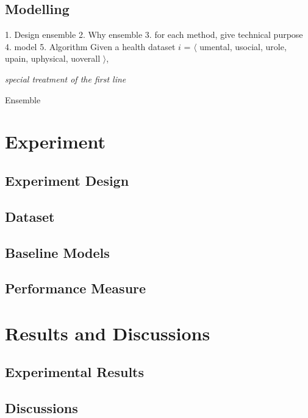 \documentclass[runningheads]{llncs}
\begin{document}
\subsection{Modelling}
%
%
1. Design ensemble
2. Why ensemble
3. for each method, give technical purpose
4. model
5. Algorithm
%
Given a health dataset $i$ = $\langle$ u{\tiny{mental}}, u{\tiny{social}}, u{\tiny{role}}, u{\tiny{pain}}, u{\tiny{physical}}, u{\tiny{overall}} $\rangle$, \\
%
%
\IncMargin{1em}
\begin{algorithm}
		\BlankLine
		\emph{special treatment of the first line}\;
	\caption{Ensemble}\label{algo_disjdecomp}
\end{algorithm}
\DecMargin{1em}
%
%
\pagebreak
\section{Experiment}
\subsection{Experiment Design}
\subsection{Dataset}
\subsection{Baseline Models}
\subsection{Performance Measure}
%
%
%
\pagebreak
\section{Results and Discussions}
\subsection{Experimental Results}
\subsection{Discussions}
%
%
\pagebreak
\end{document}

